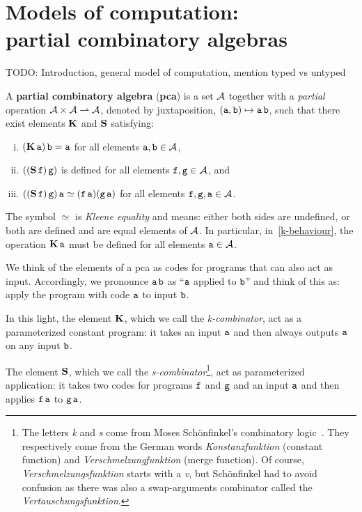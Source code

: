 \chapter[Models of computation: partial combinatory algebras]{Models of computation: \\ partial combinatory algebras}\label{chap:PCA}

\textcolor{Mulberry}{TODO: Introduction, general model of computation, mention
  typed vs untyped}

\begin{definition}\label{def:pca}
  A \textbf{partial combinatory algebra} (\textbf{pca}) is a set \(\AA\) together with a \emph{partial}
  operation \(\AA \times \AA \pto \AA\), denoted by juxtaposition,
  \((\pca{a},\pca{b}) \mapsto \pca{a}\pca{b}\), such that there exist elements \(\kcomb\) and \(\scomb\)
  satisfying:
  \begin{enumerate}[(i)]
  \item\label{k-behaviour} \((\kcomb \pca{a}) \pca{b} = \pca{a}\) for all elements
    \(\pca{a},\pca{b} \in \AA\),
  \item\label{s-defined} \(((\scomb \pca{f}) \pca{g})\) is defined for all elements
    \(\pca{f},\pca{g} \in \AA\), and
  \item\label{s-behaviour}
    \(((\scomb \pca{f}) \pca{g}) \pca{a} \simeq
    (\pca{f}\pca{a})(\pca{g}\pca{a})\) for all elements
    \(\pca{f},\pca{g},\pca{a} \in \AA\).
  \end{enumerate}
  The symbol \(\simeq\) is \emph{Kleene equality} and means: either both sides
  are undefined, or both are defined and are equal elements of \(\AA\).
  In particular, in~\ref{k-behaviour}, the operation \(\kcomb\pca{a}\) must be
  defined for all elements \(\pca{a} \in \AA\).
\end{definition}

We think of the elements of a pca as codes for programs that can also act as
input. Accordingly, we pronounce \(\pca{a}\pca{b}\) as ``\(\pca{a}\) applied to
\(\pca{b}\)'' and think of this as: apply the program with code \(\pca{a}\) to
input \(\pca{b}\).

In this light, the element \(\kcomb\), which we call the \emph{k-combinator}, act
as a parameterized constant program: it takes an input \(\pca{a}\) and then
always outputs \(\pca{a}\) on any input \(\pca{b}\).

The element \(\scomb\), which we call the \emph{s-combinator}\footnote{The
  letters \emph{k} and \emph{s} come from Moses Sch\"onfinkel's combinatory
  logic~\cite{Schonfinkel1924}. They respectively come from the German words
  \emph{Konstanzfunktion} (constant function) and \emph{Verschmelzungfunktion}
  (merge function). Of course, \emph{Verschmelzungsfunktion} starts with a
  \emph{v}, but Sch\"onfinkel had to avoid confusion as there was also a
  swap-arguments combinator called the \emph{Vertauschungsfunktion}.}, act as
parameterized application: it takes two codes for programs \(\pca{f}\) and
\(\pca{g}\) and an input \(\pca{a}\) and then applies \(\pca{f}\pca{a}\) to
\(\pca{g}\pca{a}\).

